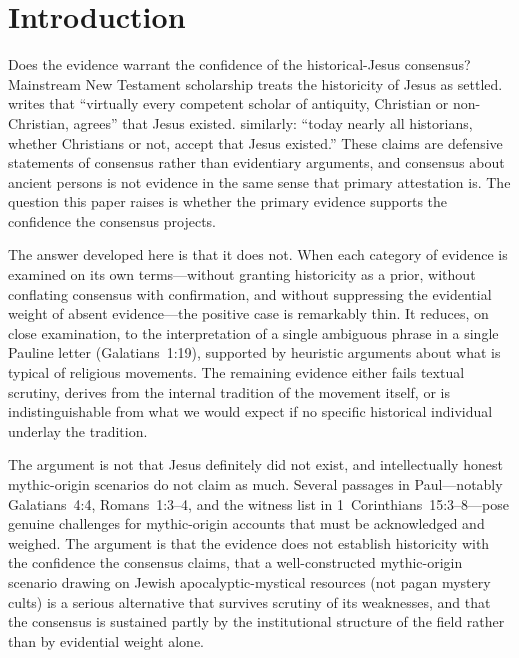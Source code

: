 \documentclass[12pt,oneside]{article}
\begin{document}
\section{Introduction}

Does the evidence warrant the confidence of the historical-Jesus
consensus?  Mainstream New Testament scholarship treats the
historicity of Jesus as settled.  \citet{Ehrman2012} writes that
\enquote{virtually every competent scholar of antiquity, Christian
or non-Christian, agrees} that Jesus existed.  \citet{Dunn2003}
similarly: \enquote{today nearly all historians, whether Christians
or not, accept that Jesus existed.}  These claims are defensive
statements of consensus rather than evidentiary arguments, and
consensus about ancient persons is not evidence in the same sense
that primary attestation is.  The question this paper raises is
whether the primary evidence supports the confidence the consensus
projects.

The answer developed here is that it does not.  When each category
of evidence is examined on its own terms---without granting
historicity as a prior, without conflating consensus with
confirmation, and without suppressing the evidential weight of
absent evidence---the positive case is remarkably thin.  It reduces,
on close examination, to the interpretation of a single ambiguous
phrase in a single Pauline letter (Galatians~1:19), supported by
heuristic arguments about what is typical of religious movements.
The remaining evidence either fails textual scrutiny, derives from
the internal tradition of the movement itself, or is
indistinguishable from what we would expect if no specific
historical individual underlay the tradition.

The argument is not that Jesus definitely did not exist, and
intellectually honest mythic-origin scenarios do not claim as much.
Several passages in Paul---notably Galatians~4:4, Romans~1:3--4,
and the witness list in 1~Corinthians~15:3--8---pose genuine
challenges for mythic-origin accounts that must be acknowledged and
weighed.  The argument is that the evidence does not establish
historicity with the confidence the consensus claims, that a
well-constructed mythic-origin scenario drawing on Jewish
apocalyptic-mystical resources (not pagan mystery cults) is a
serious alternative that survives scrutiny of its weaknesses, and
that the consensus is sustained partly by the institutional
structure of the field rather than by evidential weight alone.
\end{document}
